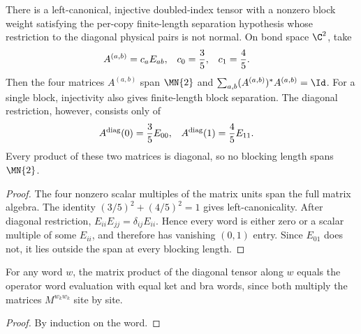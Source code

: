 \begin{lemma}
    \label{thm:diagonal_restriction_not_normal}
    \leanok
    There is a left-canonical, injective doubled-index tensor with a nonzero
    block weight satisfying the per-copy finite-length separation
    hypothesis whose restriction to the diagonal physical pairs is not normal.
    On bond space $\C^2$, take
    \begin{align}
        A^{(a,b)} & =c_aE_{ab},
                  &
        c_0       & =\frac35,
                  &
        c_1       & =\frac45.
        \notag
    \end{align}
    Then the four matrices $A^{(a,b)}$ span $\MN{2}$ and
    $\sum_{a,b}(A^{(a,b)})^*A^{(a,b)}=\Id$.
    For a single block, injectivity also gives finite-length block separation.
    The diagonal restriction, however, consists only of
    \begin{align}
        A^{\mathrm{diag}}(0) & =\frac35E_{00},
                             &
        A^{\mathrm{diag}}(1) & =\frac45E_{11}.
        \notag
    \end{align}
    Every product of these two matrices is diagonal, so no blocking length spans
    $\MN{2}$.
\end{lemma}
\begin{proof}\leanok
    The four nonzero scalar multiples of the matrix units span the full matrix
    algebra. The identity $(3/5)^2+(4/5)^2=1$ gives left-canonicality. After
    diagonal restriction, $E_{ii}E_{jj}=\delta_{ij}E_{ii}$.
    Hence every word is either zero or a scalar multiple of some $E_{ii}$, and
    therefore has vanishing $(0,1)$ entry. Since $E_{01}$ does not, it lies
    outside the span at every blocking length.
\end{proof}

\begin{lemma}
    \label{lem:eval_word_diagonal_tensor}
    \leanok
    For any word $w$, the matrix product of the diagonal tensor along $w$ equals the
    operator word evaluation with equal ket and bra words, since both multiply the
    matrices $M^{w_kw_k}$ site by site.
\end{lemma}
\begin{proof}\leanok
    By induction on the word.
\end{proof}


